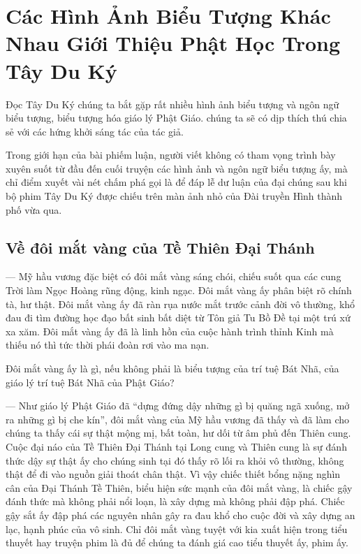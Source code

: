 \chapter{Các Hình Ảnh Biểu Tượng Khác Nhau Giới Thiệu Phật Học Trong Tây Du Ký} %
\label{cha:cac_hinh_anh_bieu_tuong_khac_nhau_gioi_thieu_phat_hoc_trong_tay_du_ky}

Đọc Tây Du Ký chúng ta bắt gặp rất nhiều hình ảnh biểu tượng và ngôn ngữ biểu tượng, biểu tượng hóa giáo lý Phật Giáo. chúng ta sẽ có dịp thích thú chia sẻ với các hứng khởi sáng tác của tác giả.

Trong giới hạn của bài phiếm luận, người viết không có tham vọng trình bày xuyên suốt từ đầu đến cuối truyện các hình ảnh và ngôn ngữ biểu tượng ấy, mà chỉ điểm xuyết vài nét chấm phá gọi là để đáp lễ dư luận của đại chúng sau khi bộ phim Tây Du Ký được chiếu trên màn ảnh nhỏ của Đài truyền Hình thành phố vừa qua.

\section{Về đôi mắt vàng của Tề Thiên Đại Thánh} %
\label{sec:ve_doi_mat_vang_cua_te_thien}

— Mỹ hầu vương đặc biệt có đôi mắt vàng sáng chói, chiếu suốt qua các cung Trời làm Ngọc Hoàng rũng động, kinh ngạc. Đôi mắt vàng ấy phân biệt rõ chính tà, hư thật. Đôi mắt vàng ấy đã ràn rụa nước mắt trước cảnh đời vô thường, khổ đau đi tìm đường học đạo bất sinh bất diệt từ Tôn giả Tu Bồ Đề tại một trú xứ xa xăm. Đôi mắt vàng ấy đã là linh hồn của cuộc hành trình thỉnh Kinh mà thiếu nó thì tức thời phái đoàn rơi vào ma nạn.

Đôi mắt vàng ấy là gì, nếu không phải là biểu tượng của trí tuệ Bát Nhã, của giáo lý trí tuệ Bát Nhã của Phật Giáo?

— Như giáo lý Phật Giáo đã ``dựng đứng dậy những gì bị quăng ngã xuống, mở ra những gì bị che kín'', đôi mắt vàng của Mỹ hầu vương đã thấy và đã làm cho chúng ta thấy cái sự thật mộng mị, bất toàn, hư dối từ âm phủ đến Thiên cung. Cuộc đại náo của Tề Thiên Đại Thánh tại Long cung và Thiên cung là sự đánh thức dậy sự thật ấy cho chúng sinh tại đó thấy rõ lối ra khỏi vô thường, không thật để đi vào nguồn giải thoát chân thật. Vì vậy chiếc thiết bổng nặng nghìn cân của Đại Thánh Tề Thiên, biểu hiện sức mạnh của đôi mắt vàng, là chiếc gậy đánh thức mà không phải nổi loạn, là xây dựng mà không phải đập phá. Chiếc gậy sắt ấy đập phá các nguyên nhân gây ra đau khổ cho cuộc đời và xây dựng an lạc, hạnh phúc của vô sinh. Chỉ đôi mắt vàng tuyệt với kia xuất hiện trong tiểu thuyết hay truyện phim là đủ để chúng ta đánh giá cao tiểu thuyết ấy, phim ấy.

